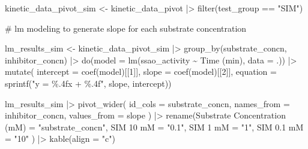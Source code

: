 \documentclass[
  letterpaper,
  DIV=11,
  numbers=noendperiod]{scrreprt}
\newenvironment{Shaded}{\begin{snugshade}}{\end{snugshade}}
\newcommand{\AttributeTok}[1]{\textcolor[rgb]{0.40,0.45,0.13}{#1}}
\newcommand{\CommentTok}[1]{\textcolor[rgb]{0.37,0.37,0.37}{#1}}
\newcommand{\DecValTok}[1]{\textcolor[rgb]{0.68,0.00,0.00}{#1}}
\newcommand{\FunctionTok}[1]{\textcolor[rgb]{0.28,0.35,0.67}{#1}}
\newcommand{\NormalTok}[1]{\textcolor[rgb]{0.00,0.23,0.31}{#1}}
\newcommand{\OtherTok}[1]{\textcolor[rgb]{0.00,0.23,0.31}{#1}}
\newcommand{\SpecialCharTok}[1]{\textcolor[rgb]{0.37,0.37,0.37}{#1}}
\newcommand{\StringTok}[1]{\textcolor[rgb]{0.13,0.47,0.30}{#1}}
\begin{document}
\begin{Shaded}
\begin{Highlighting}[]
\NormalTok{kinetic\_data\_pivot\_sim }\OtherTok{\textless{}{-}}\NormalTok{ kinetic\_data\_pivot }\SpecialCharTok{|\textgreater{}} \FunctionTok{filter}\NormalTok{(test\_group }\SpecialCharTok{==} \StringTok{"SIM"}\NormalTok{)}


\CommentTok{\# lm modeling to generate slope for each substrate concentration}

\NormalTok{lm\_results\_sim }\OtherTok{\textless{}{-}}\NormalTok{ kinetic\_data\_pivot\_sim }\SpecialCharTok{|\textgreater{}} 
  \FunctionTok{group\_by}\NormalTok{(substrate\_concn, inhibitor\_concn) }\SpecialCharTok{|\textgreater{}} 
  \FunctionTok{do}\NormalTok{(}\AttributeTok{model =} \FunctionTok{lm}\NormalTok{(ssao\_activity }\SpecialCharTok{\textasciitilde{}} \StringTok{\textasciigrave{}}\AttributeTok{Time (min)}\StringTok{\textasciigrave{}}\NormalTok{, }\AttributeTok{data =}\NormalTok{ .)) }\SpecialCharTok{|\textgreater{}} 
  \FunctionTok{mutate}\NormalTok{(}
  \AttributeTok{intercept =} \FunctionTok{coef}\NormalTok{(model)[[}\DecValTok{1}\NormalTok{]],}
  \AttributeTok{slope =} \FunctionTok{coef}\NormalTok{(model)[[}\DecValTok{2}\NormalTok{]],}
  \AttributeTok{equation =} \FunctionTok{sprintf}\NormalTok{(}\StringTok{"y = \%.4fx + \%.4f"}\NormalTok{, slope, intercept))}

\NormalTok{lm\_results\_sim }\SpecialCharTok{|\textgreater{}} \FunctionTok{pivot\_wider}\NormalTok{(}
  \AttributeTok{id\_cols =}\NormalTok{ substrate\_concn,}
  \AttributeTok{names\_from =}\NormalTok{ inhibitor\_concn,}
  \AttributeTok{values\_from =}\NormalTok{ slope}
\NormalTok{) }\SpecialCharTok{|\textgreater{}} \FunctionTok{rename}\NormalTok{(}\StringTok{\textquotesingle{}Substrate Concentration (mM)\textquotesingle{}} \OtherTok{=} \StringTok{"substrate\_concn"}\NormalTok{,}
            \StringTok{\textquotesingle{}SIM 10 mM\textquotesingle{}} \OtherTok{=} \StringTok{"0.1"}\NormalTok{,}
            \StringTok{\textquotesingle{}SIM 1 mM\textquotesingle{}} \OtherTok{=} \StringTok{"1"}\NormalTok{,}
            \StringTok{\textquotesingle{}SIM 0.1 mM\textquotesingle{}} \OtherTok{=} \StringTok{"10"}
\NormalTok{            ) }\SpecialCharTok{|\textgreater{}} \FunctionTok{kable}\NormalTok{(}\AttributeTok{align =} \StringTok{"c"}\NormalTok{)}
\end{Highlighting}
\end{Shaded}
\end{document}
